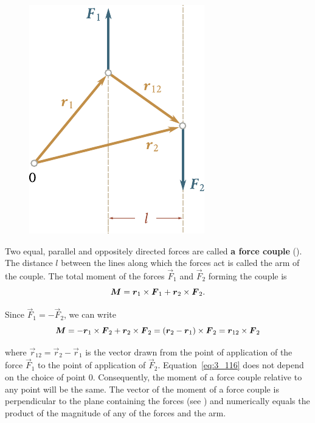 \begin{figure}[t]
	\begin{center}
		\includegraphics[scale=0.94]{figures/ch_03/fig_3_22.pdf}
		\caption[]{}
		\label{fig:3_22}
	\end{center}
	\vspace{-0.75cm}
\end{figure}

Two equal, parallel and oppositely directed forces are called \textbf{a force couple} (). The distance $l$ between the lines along which the forces act is called the arm of the couple. The total moment of the forces $\vec{F}_1$ and $\vec{F}_2$ forming the couple is
\begin{equation*}
\boldsymbol{M} = \boldsymbol{r}_{1}\times\boldsymbol{F}_{1} + \boldsymbol{r}_{2}\times\boldsymbol{F}_{2}.
\end{equation*}

\noindent
Since $\vec{F}_1=-\vec{F}_2$, we can write
\begin{equation}\label{eq:3_116}
\boldsymbol{M} = -\boldsymbol{r}_{1}\times\boldsymbol{F}_{2} + \boldsymbol{r}_{2}\times\boldsymbol{F}_{2} = (\boldsymbol{r}_2 - \boldsymbol{r}_1)\times\boldsymbol{F}_2 = \boldsymbol{r}_{12}\times\boldsymbol{F}_{2}
\end{equation}

\noindent
where $\vec{r}_{12}=\vec{r}_2-\vec{r}_1$ is the vector drawn from the point of application of the force $\vec{F}_1$ to the point of application of $\vec{F}_2$. Equation~\eqref{eq:3_116} does not depend on the choice of point $0$. Consequently, the moment of a force couple relative to any point will be the same. The vector of the moment of a force couple is perpendicular to the plane containing the forces (see ) and numerically equals the product of the magnitude of any of the forces and the arm.

